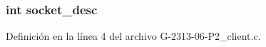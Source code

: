 \subsubsection[{\texorpdfstring{socket\+\_\+desc}{socket_desc}}]{\setlength{\rightskip}{0pt plus 5cm}int socket\+\_\+desc}\hypertarget{G-2313-06-P2__client__common__functions_8c_adeadf7cb6916a10c7142ce7d265ab32a}{}\label{G-2313-06-P2__client__common__functions_8c_adeadf7cb6916a10c7142ce7d265ab32a}


Definición en la línea 4 del archivo G-\/2313-\/06-\/\+P2\+\_\+client.\+c.

